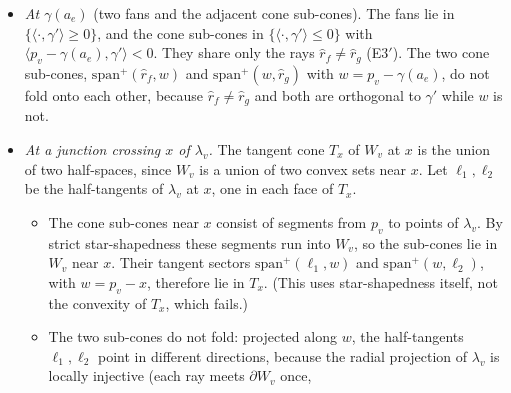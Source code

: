\documentclass[preprint,12pt]{elsarticle}
\theoremstyle{definition}
\theoremstyle{remark}
\newcommand{\R}{\mathbb{R}}
\newcommand{\inter}{\operatorname{int}}
\begin{document}
\begin{itemize}
star-shapedness.
  \begin{itemize}
  \item The fan sector $\mathrm{span}^+(k',-\hat r)$ lies in $\{\langle\cdot,\gamma'\rangle\ge0\}$.
  \item The $Q_f$ half-plane, bounded by $\R k'$ and containing $c'$, lies in $\{\langle\cdot,\hat r\rangle\ge0\}$.
  \item The two cone sub-sectors $\mathrm{span}^+(-\hat r,w)$ and $\mathrm{span}^+(w,-k')$ lie in $Q$.
  \end{itemize}
  So the fan and $Q_f$ sectors lie in the closure of the complement of $Q$, and the cone sectors lie in $Q$. They share
  only the rays $k'$ (fan and $Q_f$), $-\hat r$ (fan and cone), $w$ (between the two cone sub-sectors) and $-k'$ (cone
  and $Q_f$). The two cone sub-sectors do not fold: if $-\hat r$, $w$, $-k'$ were coplanar, then $w\in\inter Q$ would
  force $w=-a\hat r-bk'$ with $a,b>0$, strictly between them. Hence the tangent cone is an embedded disk.
\item \emph{At $\gamma(a_e)$} (two fans and the adjacent cone sub-cones). The fans lie in
$\{\langle\cdot,\gamma'\rangle\ge0\}$, and the cone sub-cones in $\{\langle\cdot,\gamma'\rangle\le0\}$ with
$\langle p_v-\gamma(a_e),\gamma'\rangle<0$. They share only the rays $\hat r_f\ne\hat r_g$ (E3$'$). The two cone
sub-cones, $\mathrm{span}^+(\hat r_f,w)$ and $\mathrm{span}^+(w,\hat r_g)$ with $w=p_v-\gamma(a_e)$, do not fold onto each
other, because $\hat r_f\ne\hat r_g$ and both are orthogonal to $\gamma'$ while $w$ is not.
\item \emph{At a junction crossing $x$ of $\lambda_v$.} The tangent cone $T_x$ of $W_v$ at $x$ is the union of two
half-spaces, since $W_v$ is a union of two convex sets near $x$. Let $\ell_1,\ell_2$ be the half-tangents of $\lambda_v$
at $x$, one in each face of $T_x$.
  \begin{itemize}
  \item The cone sub-cones near $x$ consist of segments from $p_v$ to points of $\lambda_v$. By strict star-shapedness
  these segments run into $W_v$, so the sub-cones lie in $W_v$ near $x$. Their tangent sectors
  $\mathrm{span}^+(\ell_1,w)$ and $\mathrm{span}^+(w,\ell_2)$, with $w=p_v-x$, therefore lie in $T_x$. (This uses
  star-shapedness itself, not the convexity of $T_x$, which fails.)
  \item The two sub-cones do not fold: projected along $w$, the half-tangents $\ell_1,\ell_2$ point in different
  directions, because the radial projection of $\lambda_v$ is locally injective (each ray meets $\partial W_v$ once,

\end{itemize}
\end{itemize}
\end{document}
